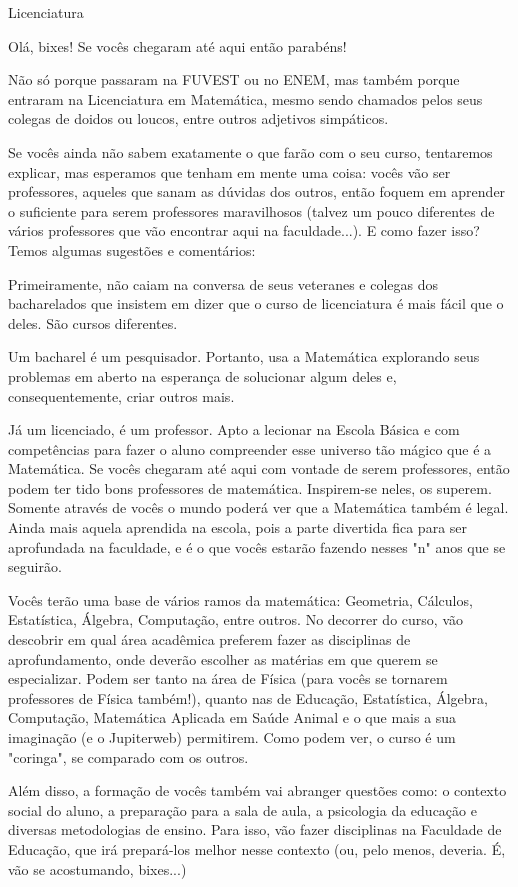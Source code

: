 \begin{subsecao}{Licenciatura}

Olá, bixes! Se vocês chegaram até aqui então parabéns!

Não só porque passaram na FUVEST ou no ENEM, mas também porque entraram na
Licenciatura em Matemática, mesmo sendo chamados pelos seus colegas de doidos ou
loucos, entre outros adjetivos simpáticos.

Se vocês ainda não sabem exatamente o que farão com o seu curso, tentaremos
explicar, mas esperamos que tenham em mente uma coisa: vocês vão ser
professores, aqueles que sanam as dúvidas dos outros, então foquem em
aprender o suficiente para serem professores maravilhosos (talvez um pouco diferentes
de vários professores que vão encontrar aqui na faculdade...). E como fazer isso? 
Temos algumas sugestões e comentários:

Primeiramente, não caiam na conversa de seus veteranes e colegas dos bacharelados
que insistem em dizer que o curso de licenciatura é mais fácil que o deles. São
cursos diferentes.

Um bacharel é um pesquisador. Portanto, usa a Matemática explorando seus
problemas em aberto na esperança de solucionar algum deles e, consequentemente,
criar outros mais.

Já um licenciado, é um professor. Apto a lecionar na Escola Básica e com
competências para fazer o aluno compreender esse universo tão mágico que é a
Matemática. Se vocês chegaram até aqui com vontade de serem professores, então
podem ter tido bons professores de matemática. Inspirem-se neles, os
superem. Somente através de vocês o mundo poderá ver que a Matemática também é legal. 
Ainda mais aquela aprendida na escola, pois a parte divertida fica para ser 
aprofundada na faculdade, e é o que vocês estarão fazendo nesses "n" anos que se seguirão.

Vocês terão uma base de vários ramos da matemática: Geometria, Cálculos,
Estatística, Álgebra, Computação, entre outros. No decorrer do curso, vão
descobrir em qual área acadêmica preferem fazer as disciplinas de
aprofundamento, onde deverão escolher as matérias em que querem se especializar.
Podem ser tanto na área de Física (para vocês se tornarem professores de Física
também!), quanto nas de Educação, Estatística, Álgebra, Computação, Matemática
Aplicada em Saúde Animal e o que mais a sua imaginação (e o Jupiterweb) permitirem.
Como podem ver, o curso é um "coringa", se comparado com os outros.

Além disso, a formação de vocês também vai abranger questões como: o contexto
social do aluno, a preparação para a sala de aula, a psicologia da educação e
diversas metodologias de ensino. Para isso, vão fazer disciplinas na
Faculdade de Educação, que irá prepará-los melhor nesse contexto (ou, pelo
menos, deveria. É, vão se acostumando, bixes...)


\end{subsecao}
